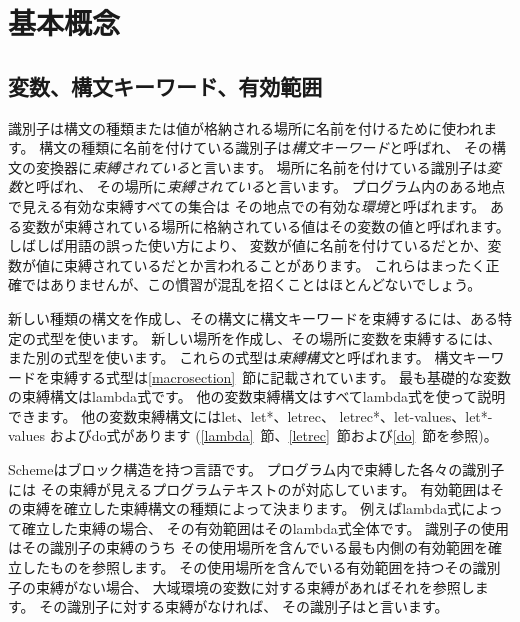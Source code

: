 \chapter{基本概念}
\label{basicchapter}

\section{変数、構文キーワード、有効範囲}
\label{specialformsection}
\label{variablesection}

識別子は構文の種類または値が格納される場所に名前を付けるために使われます。
構文の種類に名前を付けている識別子は{\em 構文キーワード}と呼ばれ、
その構文の変換器に{\em 束縛されている}と言います。
場所に名前を付けている識別子は{\em 変数}と呼ばれ、
その場所に{\em 束縛されている}と言います。
プログラム内のある地点で見える有効な束縛すべての集合は
その地点での有効な{\em 環境}と呼ばれます。
ある変数が束縛されている場所に格納されている値はその変数の値と呼ばれます。
しばしば用語の誤った使い方により、
変数が値に名前を付けているだとか、変数が値に束縛されているだとか言われることがあります。
これらはまったく正確ではありませんが、この慣習が混乱を招くことはほとんどないでしょう。

\vest 新しい種類の構文を作成し、その構文に構文キーワードを束縛するには、ある特定の式型を使います。
新しい場所を作成し、その場所に変数を束縛するには、また別の式型を使います。
これらの式型は{\em 束縛構文}と呼ばれます。
構文キーワードを束縛する式型は\ref{macrosection}~節に記載されています。
最も基礎的な変数の束縛構文は{\cf lambda}式です。
他の変数束縛構文はすべて{\cf lambda}式を使って説明できます。
他の変数束縛構文には{\cf let}、{\cf let*}、{\cf letrec}、
{\cf letrec*}、{\cf let-values}、{\cf let*-values}
および{\cf do}式があります
(\ref{lambda}~節、\ref{letrec}~節および\ref{do}~節を参照)。


\vest Schemeはブロック構造を持つ言語です。
プログラム内で束縛した各々の識別子には
その束縛が見えるプログラムテキストのが対応しています。
有効範囲はその束縛を確立した束縛構文の種類によって決まります。
例えば{\cf lambda}式によって確立した束縛の場合、
その有効範囲はその{\cf lambda}式全体です。
識別子の使用はその識別子の束縛のうち
その使用場所を含んでいる最も内側の有効範囲を確立したものを参照します。
その使用場所を含んでいる有効範囲を持つその識別子の束縛がない場合、
大域環境の変数に対する束縛があればそれを参照します。
その識別子に対する束縛がなければ、
その識別子はと言います。

